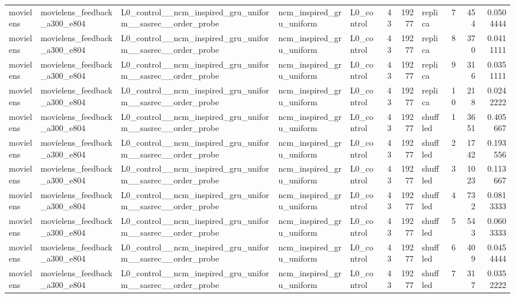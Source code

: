 \begin{table}[htbp!]
\begin{tabular}{lllllrrlrrr}
movielens & movielens\_feedback\_a300\_e804 & L0\_control\_\_ncm\_inspired\_gru\_uniform\_\_sasrec\_\_order\_probe & ncm\_inspired\_gru\_uniform & L0\_control & 43 & 19277 & replica & 7 & 454 & 0.0504444 \\
movielens & movielens\_feedback\_a300\_e804 & L0\_control\_\_ncm\_inspired\_gru\_uniform\_\_sasrec\_\_order\_probe & ncm\_inspired\_gru\_uniform & L0\_control & 43 & 19277 & replica & 8 & 370 & 0.0411111 \\
movielens & movielens\_feedback\_a300\_e804 & L0\_control\_\_ncm\_inspired\_gru\_uniform\_\_sasrec\_\_order\_probe & ncm\_inspired\_gru\_uniform & L0\_control & 43 & 19277 & replica & 9 & 316 & 0.0351111 \\
movielens & movielens\_feedback\_a300\_e804 & L0\_control\_\_ncm\_inspired\_gru\_uniform\_\_sasrec\_\_order\_probe & ncm\_inspired\_gru\_uniform & L0\_control & 43 & 19277 & replica & 10 & 218 & 0.0242222 \\
movielens & movielens\_feedback\_a300\_e804 & L0\_control\_\_ncm\_inspired\_gru\_uniform\_\_sasrec\_\_order\_probe & ncm\_inspired\_gru\_uniform & L0\_control & 43 & 19277 & shuffled & 1 & 3651 & 0.405667 \\
movielens & movielens\_feedback\_a300\_e804 & L0\_control\_\_ncm\_inspired\_gru\_uniform\_\_sasrec\_\_order\_probe & ncm\_inspired\_gru\_uniform & L0\_control & 43 & 19277 & shuffled & 2 & 1742 & 0.193556 \\
movielens & movielens\_feedback\_a300\_e804 & L0\_control\_\_ncm\_inspired\_gru\_uniform\_\_sasrec\_\_order\_probe & ncm\_inspired\_gru\_uniform & L0\_control & 43 & 19277 & shuffled & 3 & 1023 & 0.113667 \\
movielens & movielens\_feedback\_a300\_e804 & L0\_control\_\_ncm\_inspired\_gru\_uniform\_\_sasrec\_\_order\_probe & ncm\_inspired\_gru\_uniform & L0\_control & 43 & 19277 & shuffled & 4 & 732 & 0.0813333 \\
movielens & movielens\_feedback\_a300\_e804 & L0\_control\_\_ncm\_inspired\_gru\_uniform\_\_sasrec\_\_order\_probe & ncm\_inspired\_gru\_uniform & L0\_control & 43 & 19277 & shuffled & 5 & 543 & 0.0603333 \\
movielens & movielens\_feedback\_a300\_e804 & L0\_control\_\_ncm\_inspired\_gru\_uniform\_\_sasrec\_\_order\_probe & ncm\_inspired\_gru\_uniform & L0\_control & 43 & 19277 & shuffled & 6 & 409 & 0.0454444 \\
movielens & movielens\_feedback\_a300\_e804 & L0\_control\_\_ncm\_inspired\_gru\_uniform\_\_sasrec\_\_order\_probe & ncm\_inspired\_gru\_uniform & L0\_control & 43 & 19277 & shuffled & 7 & 317 & 0.0352222 \\

\end{tabular}
\end{table}
